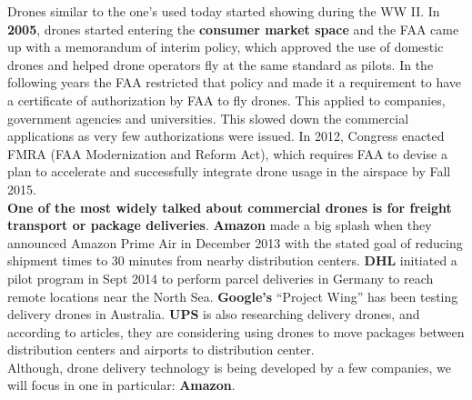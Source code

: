 \documentclass[conference]{IEEEtran}
\begin{document}
Drones similar to the one’s used today started showing during the WW II.
In \textbf{2005}, drones started entering the \textbf{consumer market space} and the FAA came up with a memorandum of interim policy, which approved the use of domestic drones and helped drone operators fly at the same standard as pilots.
In the following years the FAA restricted that policy and made it a requirement to have a certificate of authorization by FAA to fly drones. This applied to companies, government 
agencies and universities. This slowed down the commercial applications as very few
authorizations were issued. In 2012, Congress enacted FMRA (FAA Modernization and Reform Act), which requires FAA to devise a plan to accelerate and successfully integrate drone usage in the airspace by Fall 2015.\\

\textbf{One of the most widely talked about commercial drones is for freight transport or package deliveries}. \textbf{Amazon} made a big splash when they announced Amazon Prime Air in December 2013 with the stated goal of reducing shipment times to 30 minutes from nearby distribution centers. \textbf{DHL} initiated a pilot program in Sept 2014 to perform parcel deliveries in Germany to reach remote locations near the North Sea. \textbf{Google's} ``Project Wing'' has been testing delivery drones in Australia. \textbf{UPS} is also researching delivery drones, and according to articles, they are considering using drones to move packages between distribution centers and airports to distribution center.\\

Although, drone delivery technology is being developed by a few companies, we will focus in one in particular: \textbf{Amazon}.\\


%
%
\end{document}
